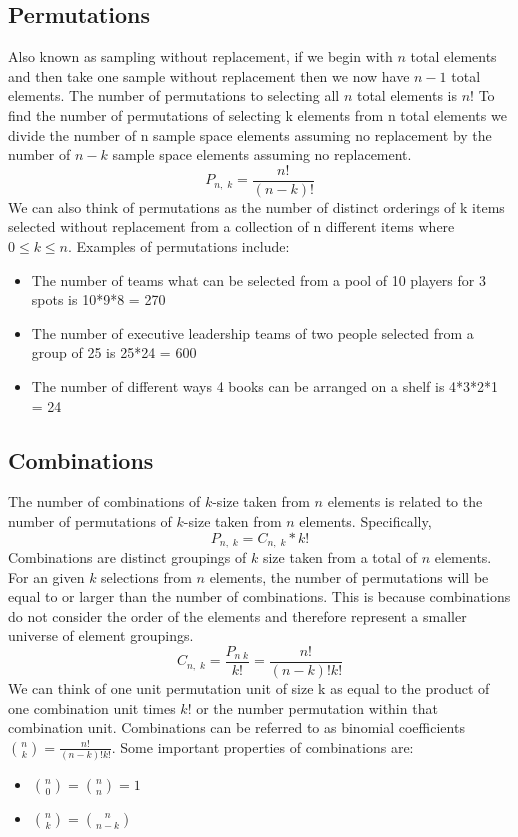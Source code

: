 \documentclass[fleqn]{article}
\begin{document}
\subsection{Permutations}
Also known as sampling without replacement, if we begin with $n$ total elements and then take one sample without replacement then we now have $n-1$ total elements. The number of permutations to selecting all $n$ total elements is $n!$ To find the number of permutations of selecting k elements from n total elements we divide the number of n sample space elements assuming no replacement by the number of $n - k$ sample space elements assuming no replacement.$$P_{n,\;k} = \frac{n!}{(n - k)!}$$ We can also think of permutations as the number of distinct orderings of k items selected without replacement
from a collection of n different items where $0 \leq k \leq n$. Examples of permutations include:
\begin{itemize}
	\item The number of teams what can be selected from a pool of 10 players for 3 spots is 10*9*8 = 270
	\item The number of executive leadership teams of two people selected from a group of 25 is 25*24 = 600
	\item The number of different ways 4 books can be arranged on a shelf is 4*3*2*1 = 24
\end{itemize}
\subsection{Combinations}
The number of combinations of $k$-size taken from $n$ elements is related to the number of permutations of $k$-size taken from $n$ elements. Specifically, $$P_{n,\;k} = C_{n,\;k} * k!$$ Combinations are distinct groupings of $k$ size taken from a total of $n$ elements. For an given $k$ selections from $n$ elements, the number of permutations will be equal to or larger than the number of combinations. This is because combinations do not consider the order of the elements and therefore represent a smaller universe of element groupings.$$C_{n,\;k} = \frac{P_{n\;k}}{k!} = \frac{n!}{(n-k)!k!}$$ We can think of one unit permutation unit of size k as equal to the product of one combination unit times $k!$ or the number permutation within that combination unit. Combinations can be referred to as binomial coefficients $\binom{n}{k} = \frac{n!}{(n-k)!k!}$. Some important properties of combinations are:
\begin{itemize}
	\item $\binom{n}{0} = \binom{n}{n} = 1$
	\item $\binom{n}{k} = \binom{n}{n-k}$
\end{itemize}
\end{document}
